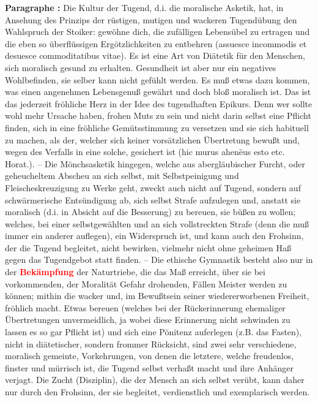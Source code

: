 \documentclass[a4paper,12pt,twoside]{book}
\newcommand{\match}[1]{\textcolor{red}{\textbf{#1}}}
\begin{document}
	\textbf{Paragraphe : }Die Kultur der Tugend, d.i. die moralische Asketik, hat, in Ansehung des Prinzips der rüstigen, mutigen und wackeren Tugendübung den Wahlspruch der Stoiker: gewöhne dich, die zufälligen Lebensübel zu ertragen und die eben so überflüssigen Ergötzlichkeiten zu entbehren (assuesce incommodis et desuesce commoditatibus vitae). Es ist eine Art von Diätetik für den Menschen, sich moralisch gesund zu erhalten. Gesundheit ist aber nur ein negatives  Wohlbefinden, sie selber kann nicht gefühlt werden. Es muß etwas dazu kommen, was einen angenehmen Lebensgenuß gewährt und doch bloß moralisch ist. Das ist das jederzeit fröhliche Herz in der Idee des tugendhaften Epikurs. Denn wer sollte wohl mehr Ursache haben, frohen Muts zu sein und nicht darin selbst eine Pflicht finden, sich in eine fröhliche Gemütsstimmung zu versetzen und sie sich habituell zu machen, als der, welcher sich keiner vorsätzlichen Übertretung bewußt und, wegen des Verfalls in eine solche, gesichert ist (hic murus ahenëus esto etc. Horat.). – Die Mönchsasketik hingegen, welche aus abergläubischer Furcht, oder geheucheltem Abscheu an sich selbst, mit Selbstpeinigung und Fleischeskreuzigung zu Werke geht, zweckt auch nicht auf Tugend, sondern auf schwärmerische Entsündigung ab, sich selbst Strafe aufzulegen und, anstatt sie moralisch (d.i. in Absicht auf die Besserung) zu bereuen, sie büßen zu wollen; welches, bei einer selbstgewählten und an sich vollstreckten Strafe (denn die muß immer ein anderer auflegen), ein Widerspruch ist, und kann auch den Frohsinn, der die Tugend begleitet, nicht bewirken, vielmehr nicht ohne geheimen Haß gegen das Tugendgebot statt finden. – Die ethische Gymnastik besteht also nur in der \match{Bekämpfung} der Naturtriebe, die das Maß erreicht, über sie bei vorkommenden, der Moralität Gefahr drohenden, Fällen Meister werden zu können; mithin die wacker und, im Bewußtsein seiner wiedererworbenen Freiheit, fröhlich macht. Etwas bereuen (welches bei der Rückerinnerung ehemaliger Übertretungen unvermeidlich, ja wobei diese Erinnerung nicht schwinden zu lassen es so gar Pflicht ist) und sich eine Pönitenz auferlegen (z.B. das Fasten), nicht in diätetischer, sondern frommer Rücksicht, sind zwei sehr verschiedene, moralisch gemeinte, Vorkehrungen, von denen die letztere, welche freudenlos, finster und mürrisch ist, die Tugend selbst verhaßt macht und ihre Anhänger verjagt. Die Zucht (Disziplin), die der Mensch an sich selbst verübt, kann daher nur durch den Frohsinn, der sie begleitet, verdienstlich und exemplarisch werden. 
	
\end{document}
